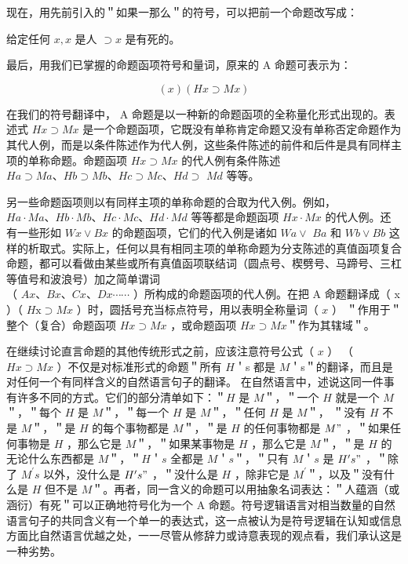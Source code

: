 现在，用先前引入的＂如果一那么＂的符号，可以把前一个命题改写成：

给定任何 $x, x$ 是人 $\supset x$ 是有死的。

最后，用我们已掌握的命题函项符号和量词，原来的 A 命题可表示为：

$$
(x)(H x \supset M x)
$$

在我们的符号翻译中， A 命题是以一种新的命题函项的全称量化形式出现的。表述式 $H x \supset M x$ 是一个命题函项，它既没有单称肯定命题又没有单称否定命题作为其代人例，而是以条件陈述作为代人例，这些条件陈述的前件和后件是具有同样主项的单称命题。命题函项 $H x \supset M x$ 的代人例有条件陈述 $H a \supset M a 、 H b \supset M b 、 H c \supset M c 、 H d \supset$ $M d$ 等等。

另一些命题函项则以有同样主项的单称命题的合取为代入例。例如， $H a \cdot M a 、 H b \cdot M b 、 H c \cdot M c 、 H d \cdot M d$ 等等都是命题函项 $H x \cdot M x$ 的代人例。还有一些形如 $W x \vee B x$ 的命题函项，它们的代入例是诸如 $W a \vee$ $B a$ 和 $W b \vee B b$ 这样的析取式。实际上，任何以具有相同主项的单称命题为分支陈述的真值函项复合命题，都可以看做由某些或所有真值函项联结词（圆点号、楔劈号、马蹄号、三杠等值号和波浪号）加之简单谓词\\
（ $A x 、 B x 、 C x 、 D x \cdots \cdots$ ）所构成的命题函项的代人例。在把 A 命题翻译成（ x ）（ $H \mathrm{x} \supset M x$ ）时，圆括号充当标点符号，用以表明全称量词（ $x$ ） ＂作用于＂整个（复合）命题函项 $H x \supset M x$ ，或命题函项 $H x \supset M x$＂作为其辖域＂。

在继续讨论直言命题的其他传统形式之前，应该注意符号公式（ $x$ ） （ $H x \supset M x$ ）不仅是对标准形式的命题＂所有 $H$＇s 都是 $M$＇s＂的翻译，而且是对任何一个有同样含义的自然语言句子的翻译。\cite{brown1954} 在自然语言中，述说这同一件事有许多不同的方式。它们的部分清单如下：＂$H$ 是 $M$＂，＂一个 $H$ 就是一个 $M$＂，＂每个 $H$ 是 $M$＂，＂每一个 $H$ 是 $M$＂，＂任何 $H$ 是 $M$＂， ＂没有 $H$ 不是 $M$＂，＂是 $H$ 的每个事物都是 $M$＂，＂是 $H$ 的任何事物都是 $M "$ ，＂如果任何事物是 $H$ ，那么它是 $M$＂，＂如果某事物是 $H$ ，那么它是 $M$＂，＂是 $H$ 的无论什么东西都是 $M$＂，＂$H$＇$s$ 全都是 $M$＇$s$＂，＂只有 $M$＇$s$ 是 $H^{\prime} s "$ ，＂除了 $M^{\prime} s$ 以外，没什么是 $H^{\prime} s "$ ，＂没什么是 $H$ ，除非它是 $M^{\prime}$＂，以及＂没有什么是 $H$ 但不是 $M$＂。再者，同一含义的命题可以用抽象名词表达：＂人蕴涵（或涵衍）有死＂可以正确地符号化为一个 A 命题。符号逻辑语言对相当数量的自然语言句子的共同含义有一个单一的表达式，这一点被认为是符号逻辑在认知或信息方面比自然语言优越之处，一一尽管从修辞力或诗意表现的观点看，我们承认这是一种劣势。 

